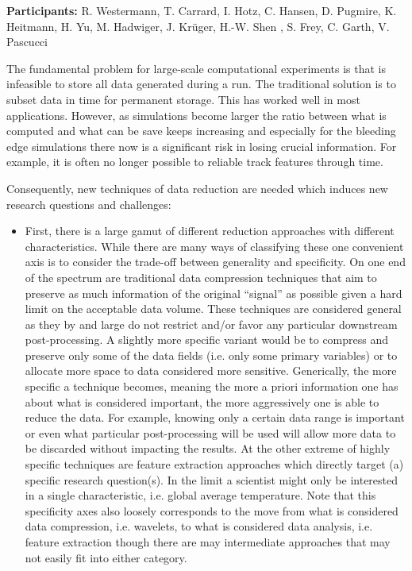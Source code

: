 \license

\begin{refsection}

\textbf{\sffamily Participants:} R. Westermann, T. Carrard, I. Hotz, C. Hansen, D. Pugmire, K. Heitmann, H. Yu, M. Hadwiger, J. Krüger, H.-W. Shen , S. Frey, C. Garth, V. Pascucci

The fundamental problem for large-scale computational experiments is that is infeasible to store all data generated during a run. The traditional solution is to subset data in time for permanent storage. This has worked well in most applications. However, as simulations become larger the ratio between what is computed and what can be save keeps increasing and especially for the bleeding edge simulations there now is a significant risk in losing crucial information. For example, it is often no longer possible to reliable track features \cite{Widanagamaachchi15} through time. 

Consequently, new techniques of data reduction are needed which induces new research questions and challenges:

\begin{itemize}
\item
First, there is a large gamut of different reduction approaches with different characteristics. While there are many ways of classifying these one convenient axis is to consider the trade-off between generality and specificity. On one end of the spectrum are traditional data compression techniques that aim to preserve as much information of the original “signal” as possible given a hard limit on the acceptable data volume. These techniques are considered general as they by and large do not restrict and/or favor any particular downstream post-processing. A slightly more specific variant would be to compress and preserve only some of the data fields (i.e. only some primary variables) or to allocate more space to data considered more sensitive. Generically, the more specific a technique becomes, meaning the more a priori information one has about what is considered important, the more aggressively one is able to reduce the data. For example, knowing only a certain data range is important or even what particular post-processing will be used will allow more data to be discarded without impacting the results. At the other extreme of highly specific techniques are feature extraction approaches which directly target (a) specific research question(s). In the limit a scientist might only be interested in a single characteristic, i.e. global average temperature. Note that this specificity axes also loosely corresponds to the move from what is considered data compression, i.e. wavelets, to what is considered data analysis, i.e. feature extraction though there are may intermediate approaches that may not easily fit into either category.


\end{itemize}
\end{refsection}
